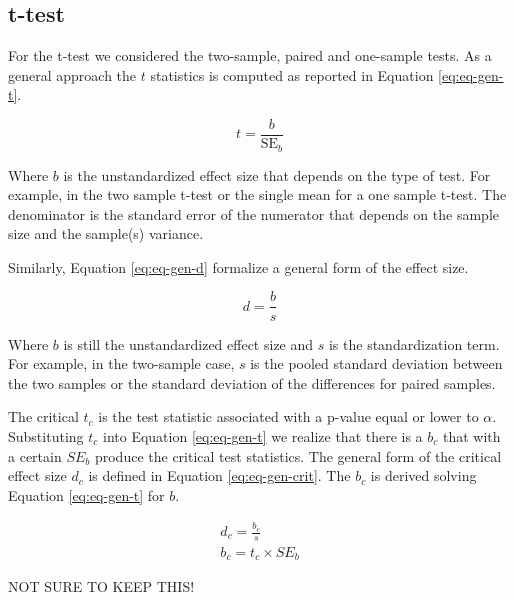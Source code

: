 \documentclass[
  man]{apa7}
\begin{document}
\hypertarget{t-test}{%
\subsection{t-test}\label{t-test}}

For the t-test we considered the two-sample, paired and one-sample tests. As a general approach the \(t\) statistics is computed as reported in Equation \eqref{eq:eq-gen-t}.

\begin{equation}
    \label{eq:eq-gen-t}
    t = \frac{b}{\text{SE}_{b}}
\end{equation}

Where \(b\) is the unstandardized effect size that depends on the type of test. For example, in the two sample t-test or the single mean for a one sample t-test. The denominator is the standard error of the numerator that depends on the sample size and the sample(s) variance.

Similarly, Equation \eqref{eq:eq-gen-d} formalize a general form of the effect size.

\begin{equation}
    \label{eq:eq-gen-d}
    d = \frac{b}{s}
\end{equation}

Where \(b\) is still the unstandardized effect size and \(s\) is the standardization term. For example, in the two-sample case, \(s\) is the pooled standard deviation between the two samples or the standard deviation of the differences for paired samples.

The critical \(t_c\) is the test statistic associated with a p-value equal or lower to \(\alpha\). Substituting \(t_c\) into Equation \eqref{eq:eq-gen-t} we realize that there is a \(b_c\) that with a certain \(SE_b\) produce the critical test statistics. The general form of the critical effect size \(d_c\) is defined in Equation \eqref{eq:eq-gen-crit}. The \(b_c\) is derived solving Equation \eqref{eq:eq-gen-t} for \(b\).

\begin{equation}
\begin{gathered}
    \label{eq:eq-gen-crit}
    d_c = \frac{b_c}{s} \\
    b_c = t_c \times SE_b
\end{gathered}
\end{equation}

NOT SURE TO KEEP THIS!
\end{document}
